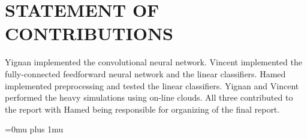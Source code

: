 \documentclass[letterpaper, 10 pt, conference]{ieeeconf}  %
\begin{document}
\addtolength{\textheight}{-12cm}   %






\section*{STATEMENT OF CONTRIBUTIONS}
Yignan implemented the convolutional neural network.
Vincent implemented the fully-connected feedforward neural
network and the linear classifiers. Hamed implemented preprocessing and tested the linear classifiers. Yignan and Vincent performed the heavy simulations using on-line clouds. All three contributed to the report with Hamed being responsible for organizing of the final report.






\Urlmuskip=0mu plus 1mu\relax


%
\end{document}
